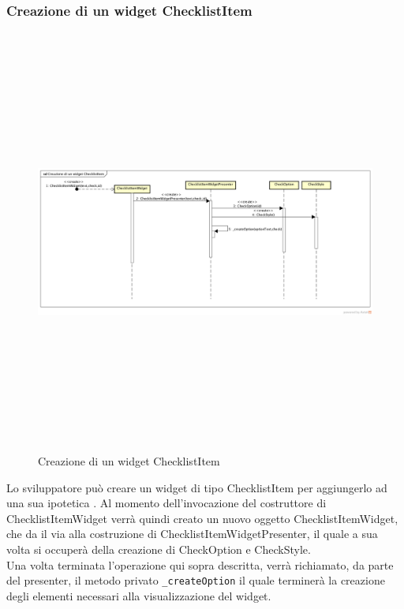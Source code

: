 \newpage

\subsubsection{Creazione di un widget ChecklistItem}

\label{Creazione di un widget ChecklistItem}
\begin{figure}[H]
	\centering
	\includegraphics[width=16cm, height=14cm]{Sezioni/Diagrammi/SDK/Creazione di un widget ChecklistItem.png}
	\caption{Creazione di un widget ChecklistItem}
\end{figure}

Lo sviluppatore può creare un widget di tipo ChecklistItem per aggiungerlo ad una sua ipotetica . Al momento dell'invocazione del costruttore di ChecklistItemWidget verrà quindi creato un nuovo oggetto ChecklistItemWidget, che da il via alla costruzione di ChecklistItemWidgetPresenter, il quale a sua volta si occuperà della creazione di CheckOption e CheckStyle.\\
Una volta terminata l'operazione qui sopra descritta, verrà richiamato, da parte del presenter, il metodo privato \texttt{\_createOption} il quale terminerà la creazione degli elementi necessari alla visualizzazione del widget.
\newpage

